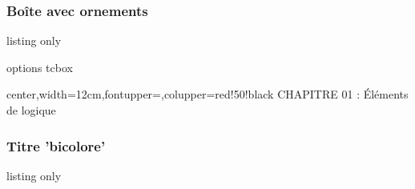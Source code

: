 \documentclass[french,11pt,a4paper]{article}
\begin{document}
\subsubsection{Boîte avec ornements}

\begin{DemoCode}{listing only}
\begin{tcboxornaments}[clés]{options tcbox}
\end{tcboxornaments}

\end{DemoCode}

\begin{DemoCode}{}
\begin{tcboxornaments}{}
\lipsum[1][1-5]
\end{tcboxornaments}
\end{DemoCode}

\begin{DemoCode}{}
\begin{tcboxornaments}
  [color deco=red!50!black,h size deco=3cm]
  {center,width=12cm,fontupper=\LARGE\sffamily,colupper=red!50!black}
CHAPITRE 01 : Éléments de logique
\end{tcboxornaments}
\end{DemoCode}

\subsubsection{Titre 'bicolore'}

\begin{DemoCode}{listing only}

\end{DemoCode}

\begin{DemoCode}{}
\end{DemoCode}
\end{document}
